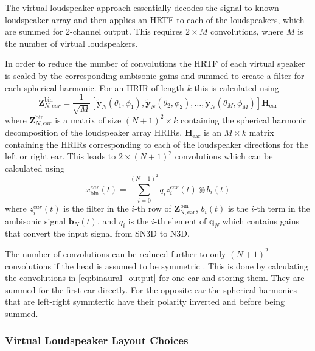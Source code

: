 \documentclass[12pt]{report}
\begin{document}
The virtual loudspeaker approach essentially decodes the signal to known loudspeaker array and then applies an HRTF to each of the loudspeakers, which are summed for 2-channel output.
This requires $2\times M$ convolutions, where $M$ is the number of virtual loudspeakers.

In order to reduce the number of convolutions the HRTF of each virtual speaker is scaled by the corresponding ambisonic gains and summed to create a filter for each spherical harmonic. For an HRIR of length $k$ this is calculated using
\begin{equation}
    \mathbf{Z}_{N,ear}^{\mathrm{bin}} = \frac{1}{\sqrt{M}} \left[ \tilde{\textbf{y}}_{N}(\theta_{1}, \phi_{1}), \tilde{\textbf{y}}_{N}(\theta_{2}, \phi_{2}), \ldots, \tilde{\textbf{y}}_{N}(\theta_{M}, \phi_{M}) \right] \mathbf{H}_{\mathrm{ear}}
\end{equation}
where $\mathbf{Z}_{N,ear}^{\mathrm{bin}}$ is a matrix of 
size $(N+1)^{2} \times k$ containing the spherical harmonic decomposition of the loudspeaker array HRIRs, $\mathbf{H}_{\mathrm{ear}}$ is an $M\times k$ matrix containing the HRIRs corresponding to each of the loudspeaker directions for the left or right ear.
This leads to $2\times (N + 1)^2$ convolutions which can be calculated using
\begin{equation}\label{eq:binaural_output}
    x_{\mathrm{bin}}^{ear}(t) = \sum_{i = 0}^{(N+1)^{2}} q_{i} z_{i}^{ear}(t) \circledast b_{i}(t)
\end{equation}
where $z_{i}^{ear}(t)$ is the filter in the $i$-th row of $\mathbf{Z}_{\mathrm{N,ear}}^{\mathrm{bin}}$, $b_{i}(t)$ is the $i$-th term in the ambisonic signal $\textbf{b}_{N}(t)$, and $q_{i}$ is the $i$-th element of $\mathbf{q}_{N}$ which contains gains that convert the input signal from SN3D to N3D.

The number of convolutions can be reduced further to only $(N+1)^2$ convolutions if the head is assumed to be symmetric \cite{politis2016jsambisonics}.
This is done by calculating the convolutions in \cref{eq:binaural_output} for one ear and storing them.
They are summed for the first ear directly.
For the opposite ear the spherical harmonics that are left-right symmtertic have their polarity inverted and before being summed.

\subsubsection{Virtual Loudspeaker Layout Choices}
\end{document}
